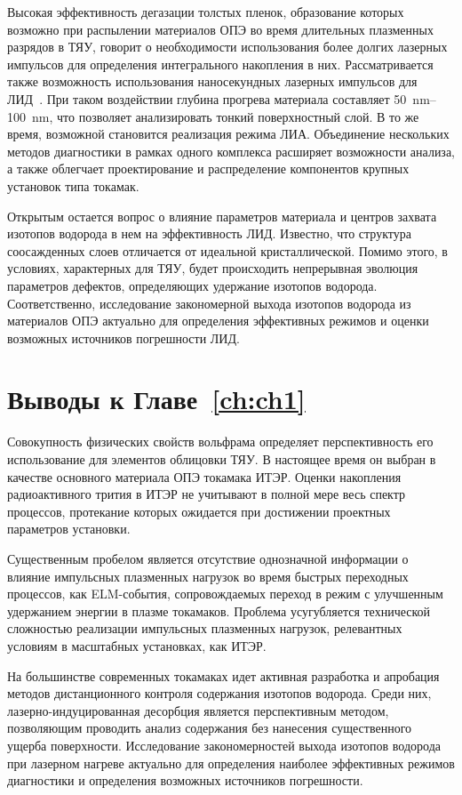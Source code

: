 Высокая эффективность дегазации толстых пленок, образование которых возможно при распылении материалов ОПЭ во время длительных плазменных разрядов в ТЯУ, говорит о необходимости использования более долгих лазерных импульсов для определения интегрального накопления в них. Рассматривается также возможность использования наносекундных лазерных импульсов для ЛИД~\cite{Medvedev2024, Gasparyan2021, Efimov2024}. При таком воздействии глубина прогрева материала составляет \SIrange{50}{100}{\nano\meter}, что позволяет анализировать тонкий поверхностный слой. В то же время, возможной становится реализация режима ЛИА. Объединение нескольких методов диагностики в рамках одного комплекса расширяет возможности анализа, а также облегчает проектирование и распределение компонентов крупных установок типа токамак.

Открытым остается вопрос о влияние параметров материала и центров захвата изотопов водорода в нем на эффективность ЛИД. Известно, что структура соосажденных слоев отличается от идеальной кристаллической. Помимо этого, в условиях, характерных для ТЯУ, будет происходить непрерывная эволюция параметров дефектов, определяющих удержание изотопов водорода. Соответственно, исследование закономерной выхода изотопов водорода из материалов ОПЭ актуально для определения эффективных режимов и оценки возможных источников погрешности ЛИД. 

\section{Выводы к Главе~\ref{ch:ch1}}

Совокупность физических свойств вольфрама определяет перспективность его использование для элементов облицовки ТЯУ. В настоящее время он выбран в качестве основного материала ОПЭ токамака ИТЭР. Оценки накопления радиоактивного трития в ИТЭР не учитывают в полной мере весь спектр процессов, протекание которых ожидается при достижении проектных параметров установки. 

Существенным пробелом является отсутствие однозначной информации о влияние импульсных плазменных нагрузок во время быстрых переходных процессов, как ELM-события, сопровождаемых переход в режим с улучшенным удержанием энергии в плазме токамаков. Проблема усугубляется технической сложностью реализации импульсных плазменных нагрузок, релевантных условиям в масштабных установках, как ИТЭР. 

На большинстве современных токамаках идет активная разработка и апробация методов дистанционного контроля содержания изотопов водорода. Среди них, лазерно-индуцированная десорбция является перспективным методом, позволяющим проводить анализ содержания без нанесения существенного ущерба поверхности. Исследование закономерностей выхода изотопов водорода при лазерном нагреве актуально для определения наиболее эффективных режимов диагностики и определения возможных источников погрешности.


\FloatBarrier
